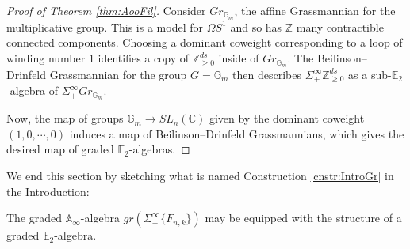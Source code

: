 \begin{proof}[Proof of Theorem \ref{thm:AooFil}]
Consider $Gr_{\mathbb{G}_m}$, the affine Grassmannian for the multiplicative group.  This is a model for $\Omega S^1$ and so has $\mathbb{Z}$ many contractible connected components.  Choosing a dominant coweight corresponding to a loop of winding number $1$ identifies a copy of $\mathbb{Z}^{ds}_{\ge 0}$ inside of $Gr_{\mathbb{G}_m}$.  The Beilinson--Drinfeld Grassmannian for the group $G=\mathbb{G}_m$ then describes $\Sigma^{\infty}_+ \mathbb{Z}^{ds}_{\ge 0}$ as a sub-$\mathbb{E}_2$-algebra of $\Sigma^{\infty}_+ Gr_{\mathbb{G}_m}$.

Now, the map of groups $\mathbb{G}_m \rightarrow SL_n(\mathbb{C})$ given by the dominant coweight $(1,0,\cdots,0)$ induces a map of Beilinson--Drinfeld Grassmannians, which gives the desired map of graded $\mathbb{E}_2$-algebras.
\end{proof}

We end this section by sketching what is named Construction \ref{cnstr:IntroGr} in the Introduction:

\begin{cnstr} \label{cnstr:E2GrConstruction}
The graded $\mathbb{A}_\infty$-algebra $gr(\Sigma^{\infty}_+ \{F_{n,k}\})$ may be equipped with the structure of a graded $\mathbb{E}_2$-algebra.
\end{cnstr}


